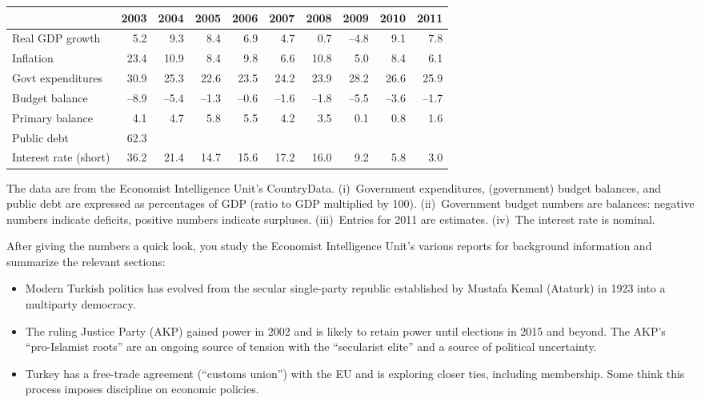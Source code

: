 \documentclass[12pt]{exam}
\begin{document}
\begin{questions}
\begin{center}
{\small
\begin{tabular}{lrrrrrrrrr}
\toprule
         & 2003 &  2004  &  2005  &  2006   & 2007  & 2008 &  2009  &  2010 & 2011 \\%
\midrule
Real GDP growth  & 5.2 & 9.3 & 8.4 & 6.9 & 4.7 & 0.7 & --4.8 & 9.1 & 7.8 \\
Inflation        &23.4 &10.9 & 8.4 & 9.8 & 6.6 & 10.8& 5.0 & 8.4 & 6.1 \\
Govt expenditures&30.9 & 25.3 & 22.6 & 23.5 & 24.2 & 23.9 & 28.2 & 26.6 & 25.9 \\
Budget balance   &--8.9&--5.4 &--1.3 &--0.6 &--1.6 &--1.8 &--5.5 &--3.6 &--1.7 \\
Primary balance  & 4.1 & 4.7 & 5.8 & 5.5 & 4.2 & 3.5 & 0.1 & 0.8 & 1.6 \\
Public debt      & 62.3 \\ %
Interest rate (short) & 36.2 & 21.4 & 14.7 & 15.6 & 17.2 & 16.0 & 9.2 & 5.8 & 3.0 \\
\bottomrule
\end{tabular}
}
\end{center}
The data are from the Economist Intelligence Unit's CountryData.
(i)~Government expenditures, (government) budget balances,
and public debt are expressed as
percentages of GDP (ratio to GDP multiplied by 100).
(ii)~Government budget numbers are balances:
negative numbers indicate deficits,
positive numbers indicate surpluses.
(iii)~Entries for 2011 are estimates.
(iv)~The interest rate is nominal.  

After giving the numbers a quick look,
you study the Economist Intelligence Unit's
various reports for background information and summarize the relevant sections:
%
\begin{itemize}
\item Modern Turkish politics has evolved from the secular
single-party republic established by Mustafa Kemal (Ataturk) in 1923 into
a multiparty democracy.

\item The ruling Justice Party (AKP) gained power in 2002
and is likely to retain power until elections in 2015 and beyond.
    The AKP's ``pro-Islamist roots'' are an ongoing source of tension
    with the ``secularist elite'' and a source of
    political uncertainty.

\item Turkey has a free-trade agreement (``customs union'')
with the EU and is exploring closer ties, including membership.
Some think this process imposes discipline on economic policies.
\end{itemize}


\end{questions}
\end{document}
